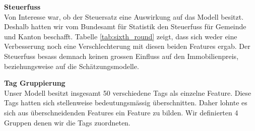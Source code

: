 \begin{table}[ht]
\centering
{}
\caption{Statistische Werte des Kaufpreises nach der Outlier Detection}
\label{tab:price_outlier}
\end{table}

\begin{table}[ht]
\centering
{}
\caption{Ergebnisse mit Einbezug des Steuerfusses}
\label{tab:sixth_round}
\end{table}

\newpage
\clearpage
\textbf{Steuerfuss}\\
Von Interesse war, ob der Steuersatz eine Auswirkung auf das Modell besitzt. Deshalb hatten wir vom Bundesamt für Statistik den Steuerfuss für Gemeinde und Kanton beschafft. Tabelle \ref{tab:sixth_round} zeigt, dass sich weder eine Verbesserung noch eine Verschlechterung mit diesen beiden Features ergab. Der Steuerfuss besass demnach keinen grossen Einfluss auf den Immobilienpreis, beziehungsweise auf die Schätzungsmodelle.

\textbf{Tag Gruppierung}\\
Unser Modell besitzt insgesamt 50 verschiedene Tags als einzelne Feature. Diese Tags hatten sich stellenweise bedeutungsmässig überschnitten. Daher lohnte es sich aus überschneidenden Features ein Feature zu bilden. Wir definierten 4 Gruppen denen wir die Tags zuordneten.

